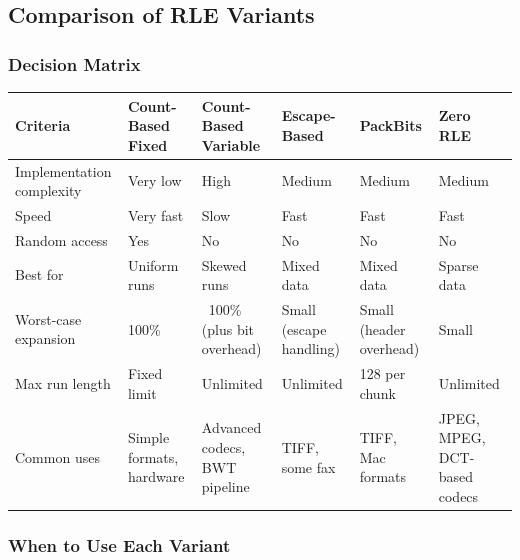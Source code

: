 \newpage
\subsection{Comparison of RLE Variants}

\subsubsection{Decision Matrix}

\begin{tabular}{|p{2.5cm}|p{2.6cm}|p{2.6cm}|p{2.6cm}|p{2.6cm}|p{2.6cm}|}
\hline
\textbf{Criteria} & \textbf{Count-Based Fixed} & \textbf{Count-Based Variable} & \textbf{Escape-Based} & \textbf{PackBits} & \textbf{Zero RLE} \\
\hline
Implementation complexity & Very low & High & Medium & Medium & Medium \\
\hline
Speed & Very fast & Slow & Fast & Fast & Fast \\
\hline
Random access & Yes & No & No & No & No \\
\hline
Best for & Uniform runs & Skewed runs & Mixed data & Mixed data & Sparse data \\
\hline
Worst-case expansion & 100\% & ~100\% (plus bit overhead) & Small (escape handling) & Small (header overhead) & Small \\
\hline
Max run length & Fixed limit & Unlimited & Unlimited & 128 per chunk & Unlimited \\
\hline
Common uses & Simple formats, hardware & Advanced codecs, BWT pipeline & TIFF, some fax & TIFF, Mac formats & JPEG, MPEG, DCT-based codecs \\
\hline
\end{tabular}

\subsubsection{When to Use Each Variant}

